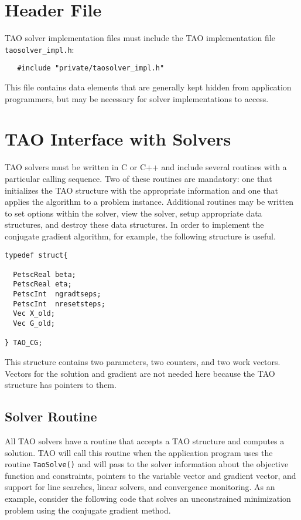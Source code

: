 \section{Header File}
TAO solver implementation files must include the TAO implementation file \texttt{taosolver\_impl.h}:
\begin{verbatim}
   #include "private/taosolver_impl.h"
\end{verbatim}
This file contains data elements that are generally kept hidden from application
programmers, but may be necessary for solver implementations to access.
\noindent


\section{TAO Interface with Solvers}
TAO solvers must be written in C or C++ and include several routines with
a particular calling sequence.  Two of these routines are mandatory:
one that initializes the TAO structure with the appropriate information
and one that applies the algorithm to a problem instance.
Additional routines may be written to set options within the
solver, view the solver, setup appropriate data structures, and destroy
these data structures. In order to implement the conjugate
gradient algorithm, for example, the following structure is
useful.
\begin{verbatim}
typedef struct{

  PetscReal beta;
  PetscReal eta;
  PetscInt  ngradtseps;
  PetscInt  nresetsteps;
  Vec X_old;
  Vec G_old; 

} TAO_CG;
\end{verbatim}
This structure contains two parameters, two counters, and two work vectors.
Vectors
for the solution and gradient are not needed here because the TAO
structure has pointers to them.


\subsection{Solver Routine}
All TAO solvers have a routine that accepts a TAO structure and
computes a solution.  
TAO will call this routine when the application
program uses the routine {\tt TaoSolve()} and will pass to the solver
information
about the objective function and constraints, pointers to the
variable vector and gradient vector, and support for line searches,
linear solvers, and convergence monitoring.  As an example, consider
the following code that solves an unconstrained minimization problem
using the conjugate gradient method.

